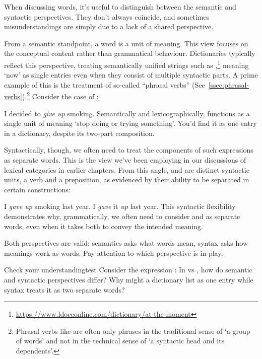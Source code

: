 When discussing words, it's useful to distinguish between the semantic and syntactic perspectives. They don't always coincide, and sometimes misunderstandings are simply due to a lack of a shared perspective.

From a semantic standpoint, a word is a unit of meaning. This view focuses on the conceptual content rather than grammatical behaviour. Dictionaries typically reflect this perspective, treating semantically unified strings such as ,\footnote{\url{https://www.ldoceonline.com/dictionary/at-the-moment}} meaning `now' as single entries even when they consist of multiple syntactic parts. A prime example of this is the treatment of so-called ``phrasal verbs'' (See~\ref{ssec:phrasal-verbs}).\footnote{Phrasal verbs like  are often only phrases in the traditional sense of `a group of words' and not in the technical sense of `a syntactic head and its dependents'.} Consider the case of :

\ea I decided to \emph{give up} smoking.
\z
\noindent Semantically and lexicographically,  functions as a single unit of meaning `stop doing or trying something'. You'd find it as one entry in a dictionary, despite its two-part composition.

Syntactically, though, we often need to treat the components of such expressions as separate words. This is the view we've been employing in our discussions of lexical categories in earlier chapters. From this angle,  and  are distinct syntactic units, a verb and a preposition, as evidenced by their ability to be separated in certain constructions:

\ea
\ea I \emph{gave up} smoking last year.
\ex I \emph{gave} it \emph{up} last year.
\z\z
This syntactic flexibility demonstrates why, grammatically, we often need to consider  and  as separate words, even when it takes both to convey the intended meaning.

Both perspectives are valid: semantics asks what words mean, syntax asks how meanings work as words. Pay attention to which perspective is in play.

\begin{tblsframedsymbol}{Check your understanding}{test}
Consider the expression : In  vs , how do semantic and syntactic perspectives differ? Why might a dictionary list  as one entry while syntax treats it as two separate words?
\end{tblsframedsymbol}

